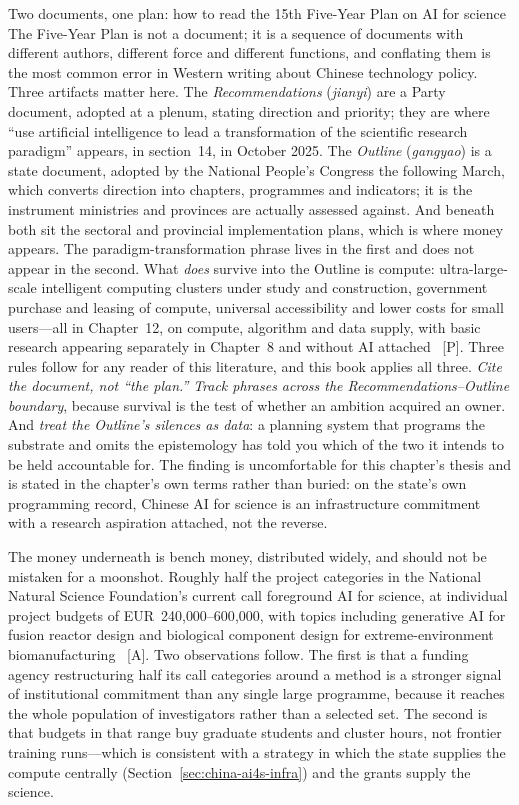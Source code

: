 \begin{casestudy}{Two documents, one plan: how to read the 15th Five-Year Plan on AI for science}
The Five-Year Plan is not a document; it is a sequence of documents with different authors, different force and different functions, and conflating them is the most common error in Western writing about Chinese technology policy. Three artifacts matter here. The \emph{Recommendations} (\emph{jianyi}) are a Party document, adopted at a plenum, stating direction and priority; they are where ``use artificial intelligence to lead a transformation of the scientific research paradigm'' appears, in section~14, in October 2025. The \emph{Outline} (\emph{gangyao}) is a state document, adopted by the National People's Congress the following March, which converts direction into chapters, programmes and indicators; it is the instrument ministries and provinces are actually assessed against. And beneath both sit the sectoral and provincial implementation plans, which is where money appears. The paradigm-transformation phrase lives in the first and does not appear in the second. What \emph{does} survive into the Outline is compute: ultra-large-scale intelligent computing clusters under study and construction, government purchase and leasing of compute, universal accessibility and lower costs for small users---all in Chapter~12, on compute, algorithm and data supply, with basic research appearing separately in Chapter~8 and without AI attached~\cite{fyp15-ai4s} [P]. Three rules follow for any reader of this literature, and this book applies all three. \emph{Cite the document, not ``the plan.''} \emph{Track phrases across the Recommendations--Outline boundary}, because survival is the test of whether an ambition acquired an owner. And \emph{treat the Outline's silences as data}: a planning system that programs the substrate and omits the epistemology has told you which of the two it intends to be held accountable for. The finding is uncomfortable for this chapter's thesis and is stated in the chapter's own terms rather than buried: on the state's own programming record, Chinese AI for science is an infrastructure commitment with a research aspiration attached, not the reverse.
\end{casestudy}

The money underneath is bench money, distributed widely, and should not be mistaken for a moonshot. Roughly half the project categories in the National Natural Science Foundation's current call foreground AI for science, at individual project budgets of EUR~240{,}000--600{,}000, with topics including generative AI for fusion reactor design and biological component design for extreme-environment biomanufacturing~\cite{nsfc-ai4s} [A]. Two observations follow. The first is that a funding agency restructuring half its call categories around a method is a stronger signal of institutional commitment than any single large programme, because it reaches the whole population of investigators rather than a selected set. The second is that budgets in that range buy graduate students and cluster hours, not frontier training runs---which is consistent with a strategy in which the state supplies the compute centrally (Section~\ref{sec:china-ai4s-infra}) and the grants supply the science.

